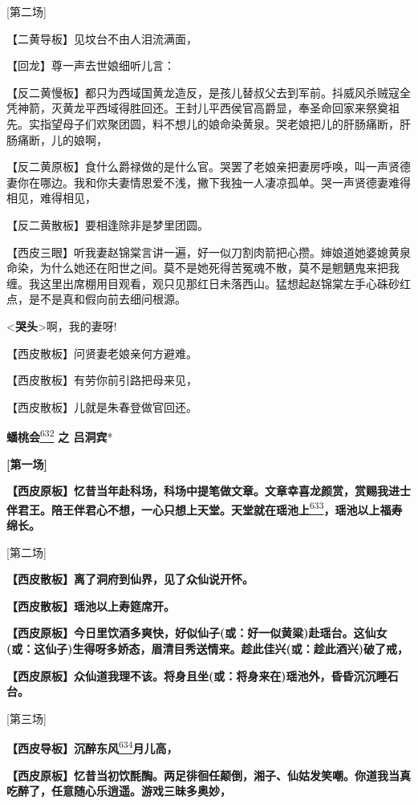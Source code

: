 {[}第二场{]}

【二黄导板】见坟台不由人泪流满面，

【回龙】尊一声去世娘细听儿言：

【反二黄慢板】都只为西域国黄龙造反，是孩儿替叔父去到军前。抖威风杀贼寇全凭神箭，灭黄龙平西域得胜回还。王封儿平西侯官高爵显，奉圣命回家来祭奠祖先。实指望母子们欢聚团圆，料不想儿的娘命染黄泉。哭老娘把儿的肝肠痛断，肝肠痛断，儿的娘啊，

【反二黄原板】食什么爵禄做的是什么官。哭罢了老娘亲把妻房呼唤，叫一声贤德妻你在哪边。我和你夫妻情恩爱不浅，撇下我独一人凄凉孤单。哭一声贤德妻难得相见，难得相见，

【反二黄散板】要相逢除非是梦里团圆。

【西皮三眼】听我妻赵锦棠言讲一遍，好一似刀割肉箭把心攒。婶娘道她婆媳黄泉命染，为什么她还在阳世之间。莫不是她死得苦冤魂不散，莫不是魍魉鬼来把我缠。我这里出席棚用目观看，观只见那红日未落西山。猛想起赵锦棠左手心硃砂红点，是不是真和假向前去细问根源。

\textless{}\textbf{哭头}\textgreater{}啊，我的妻呀!

【西皮散板】问贤妻老娘亲何方避难。

【西皮散板】有劳你前引路把母来见，

【西皮散板】儿就是朱春登做官回还。

\textbf{蟠桃会}\protect\hyperlink{fn632}{\textsuperscript{632}}
\textbf{之 吕洞宾}*

\textbf{{[}第一场{]}}

\textbf{【西皮原板】忆昔当年赴科场，科场中提笔做文章。文章幸喜龙颜赏，赏赐我进士伴君王。陪王伴君心不想，一心只想上天堂。天堂就在瑶池上}\protect\hyperlink{fn633}{\textsuperscript{633}}\textbf{，瑶池以上福寿绵长。}

{[}第二场{]}

\textbf{【西皮散板】离了洞府到仙界，见了众仙说开怀。}

\textbf{【西皮散板】瑶池以上寿筵席开。}

\textbf{【西皮原板】今日里饮酒多爽快，好似仙子(或：好一似黄粱)赴瑶台。这仙女(或：这仙子)生得呀多娇态，眉清目秀送情来。趁此佳兴(或：趁此酒兴)破了戒，}

\textbf{【西皮原板】众仙道我理不该。将身且坐(或：将身来在)瑶池外，昏昏沉沉睡石台。}

{[}第三场{]}

\textbf{【西皮导板】沉醉东风}\protect\hyperlink{fn634}{\textsuperscript{634}}\textbf{月儿高，}

\textbf{【西皮原板】忆昔当初饮酕醄。两足徘徊任颠倒，湘子、仙姑发笑嘲。你道我当真吃醉了，任意随心乐逍遥。游戏三昧多奥妙，}

